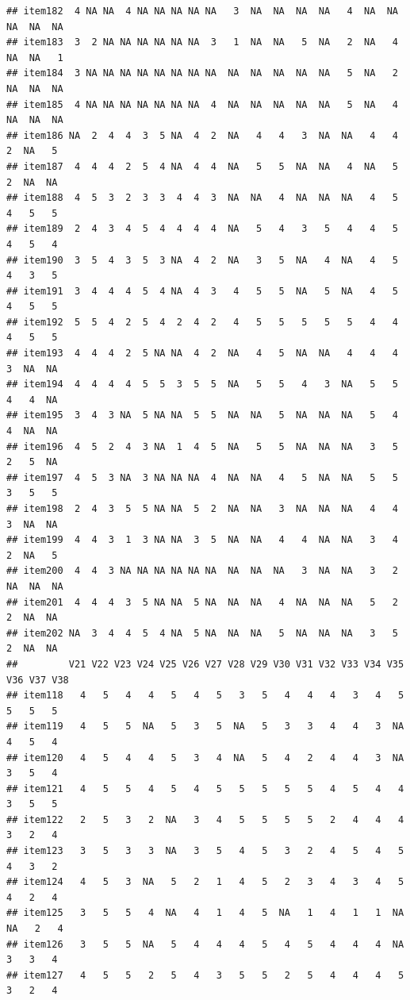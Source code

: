 \documentclass[
  man]{apa6}
\begin{document}
\begin{verbatim}
## item182  4 NA NA  4 NA NA NA NA NA   3  NA  NA  NA  NA   4  NA  NA  NA  NA  NA
## item183  3  2 NA NA NA NA NA NA  3   1  NA  NA   5  NA   2  NA   4  NA  NA   1
## item184  3 NA NA NA NA NA NA NA NA  NA  NA  NA  NA  NA   5  NA   2  NA  NA  NA
## item185  4 NA NA NA NA NA NA NA  4  NA  NA  NA  NA  NA   5  NA   4  NA  NA  NA
## item186 NA  2  4  4  3  5 NA  4  2  NA   4   4   3  NA  NA   4   4   2  NA   5
## item187  4  4  4  2  5  4 NA  4  4  NA   5   5  NA  NA   4  NA   5   2  NA  NA
## item188  4  5  3  2  3  3  4  4  3  NA  NA   4  NA  NA  NA   4   5   4   5   5
## item189  2  4  3  4  5  4  4  4  4  NA   5   4   3   5   4   4   5   4   5   4
## item190  3  5  4  3  5  3 NA  4  2  NA   3   5  NA   4  NA   4   5   4   3   5
## item191  3  4  4  4  5  4 NA  4  3   4   5   5  NA   5  NA   4   5   4   5   5
## item192  5  5  4  2  5  4  2  4  2   4   5   5   5   5   5   4   4   4   5   5
## item193  4  4  4  2  5 NA NA  4  2  NA   4   5  NA  NA   4   4   4   3  NA  NA
## item194  4  4  4  4  5  5  3  5  5  NA   5   5   4   3  NA   5   5   4   4  NA
## item195  3  4  3 NA  5 NA NA  5  5  NA  NA   5  NA  NA  NA   5   4   4  NA  NA
## item196  4  5  2  4  3 NA  1  4  5  NA   5   5  NA  NA  NA   3   5   2   5  NA
## item197  4  5  3 NA  3 NA NA NA  4  NA  NA   4   5  NA  NA   5   5   3   5   5
## item198  2  4  3  5  5 NA NA  5  2  NA  NA   3  NA  NA  NA   4   4   3  NA  NA
## item199  4  4  3  1  3 NA NA  3  5  NA  NA   4   4  NA  NA   3   4   2  NA   5
## item200  4  4  3 NA NA NA NA NA NA  NA  NA  NA   3  NA  NA   3   2  NA  NA  NA
## item201  4  4  4  3  5 NA NA  5 NA  NA  NA   4  NA  NA  NA   5   2   2  NA  NA
## item202 NA  3  4  4  5  4 NA  5 NA  NA  NA   5  NA  NA  NA   3   5   2  NA  NA
##         V21 V22 V23 V24 V25 V26 V27 V28 V29 V30 V31 V32 V33 V34 V35 V36 V37 V38
## item118   4   5   4   4   5   4   5   3   5   4   4   4   3   4   5   5   5   5
## item119   4   5   5  NA   5   3   5  NA   5   3   3   4   4   3  NA   4   5   4
## item120   4   5   4   4   5   3   4  NA   5   4   2   4   4   3  NA   3   5   4
## item121   4   5   5   4   5   4   5   5   5   5   5   4   5   4   4   3   5   5
## item122   2   5   3   2  NA   3   4   5   5   5   5   2   4   4   4   3   2   4
## item123   3   5   3   3  NA   3   5   4   5   3   2   4   5   4   5   4   3   2
## item124   4   5   3  NA   5   2   1   4   5   2   3   4   3   4   5   4   2   4
## item125   3   5   5   4  NA   4   1   4   5  NA   1   4   1   1  NA  NA   2   4
## item126   3   5   5  NA   5   4   4   4   5   4   5   4   4   4  NA   3   3   4
## item127   4   5   5   2   5   4   3   5   5   2   5   4   4   4   5   3   2   4

\end{verbatim}
\end{document}
